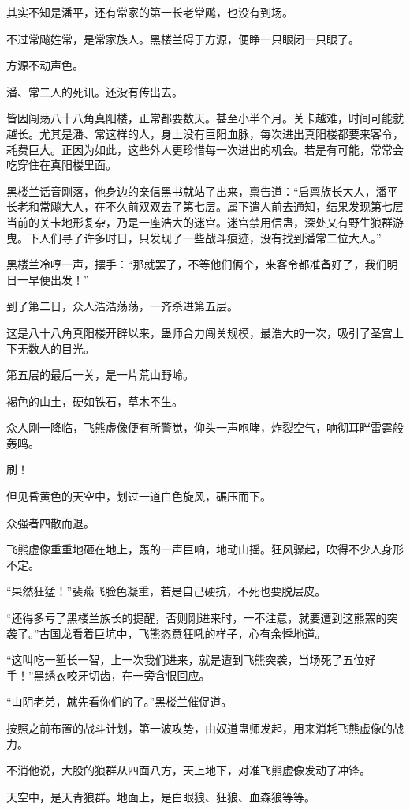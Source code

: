 \begin{this_body}
其实不知是潘平，还有常家的第一长老常飚，也没有到场。

不过常飚姓常，是常家族人。黑楼兰碍于方源，便睁一只眼闭一只眼了。

方源不动声色。

潘、常二人的死讯。还没有传出去。

皆因闯荡八十八角真阳楼，正常都要数天。甚至小半个月。关卡越难，时间可能就越长。尤其是潘、常这样的人，身上没有巨阳血脉，每次进出真阳楼都要来客令，耗费巨大。正因为如此，这些外人更珍惜每一次进出的机会。若是有可能，常常会吃穿住在真阳楼里面。

黑楼兰话音刚落，他身边的亲信黑书就站了出来，禀告道：“启禀族长大人，潘平长老和常飚大人，在不久前双双去了第七层。属下遣人前去通知，结果发现第七层当前的关卡地形复杂，乃是一座浩大的迷宫。迷宫禁用信蛊，深处又有野生狼群游曳。下人们寻了许多时日，只发现了一些战斗痕迹，没有找到潘常二位大人。”

黑楼兰冷哼一声，摆手：“那就罢了，不等他们俩个，来客令都准备好了，我们明日一早便出发！”

到了第二日，众人浩浩荡荡，一齐杀进第五层。

这是八十八角真阳楼开辟以来，蛊师合力闯关规模，最浩大的一次，吸引了圣宫上下无数人的目光。

第五层的最后一关，是一片荒山野岭。

褐色的山土，硬如铁石，草木不生。

众人刚一降临，飞熊虚像便有所警觉，仰头一声咆哮，炸裂空气，响彻耳畔雷霆般轰鸣。

刷！

但见昏黄色的天空中，划过一道白色旋风，碾压而下。

众强者四散而退。

飞熊虚像重重地砸在地上，轰的一声巨响，地动山摇。狂风骤起，吹得不少人身形不定。

“果然狂猛！”裴燕飞脸色凝重，若是自己硬抗，不死也要脱层皮。

“还得多亏了黑楼兰族长的提醒，否则刚进来时，一不注意，就要遭到这熊罴的突袭了。”古国龙看着巨坑中，飞熊恣意狂吼的样子，心有余悸地道。

“这叫吃一堑长一智，上一次我们进来，就是遭到飞熊突袭，当场死了五位好手！”黑绣衣咬牙切齿，在一旁含恨回应。

“山阴老弟，就先看你们的了。”黑楼兰催促道。

按照之前布置的战斗计划，第一波攻势，由奴道蛊师发起，用来消耗飞熊虚像的战力。

不消他说，大股的狼群从四面八方，天上地下，对准飞熊虚像发动了冲锋。

天空中，是天青狼群。地面上，是白眼狼、狂狼、血森狼等等。


\end{this_body}

